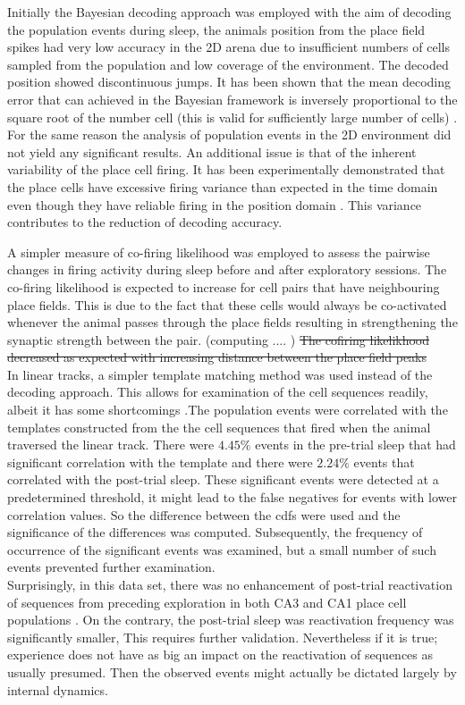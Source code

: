 Initially the Bayesian decoding approach was employed with the aim of decoding the population events during sleep, the animals position from the place field spikes had very low accuracy in the 2D arena due to insufficient numbers of cells sampled from the population and low coverage of the environment. The decoded position showed discontinuous jumps. It has been shown that the mean decoding error that can achieved in the Bayesian framework is inversely proportional to the square root of the number cell (this is valid for sufficiently large number of cells) \cite{Zhang2013}. For the same reason the analysis of population events in the 2D environment did not yield any significant results. An additional issue is that of the inherent variability of the place cell firing. It has been experimentally demonstrated that the place cells have excessive firing variance than expected in the time domain even though they have reliable firing in the position domain \cite{Fenton1998}. This variance contributes to the reduction of decoding accuracy.  

A simpler measure of co-firing likelihood was employed to assess the pairwise changes in firing activity during sleep before and after exploratory sessions. The co-firing likelihood is expected to increase for cell pairs that have neighbouring place fields. This is due to the fact that these cells would always be co-activated whenever the animal passes through the place fields resulting in strengthening the synaptic strength between the pair. (computing .... ) 
\st{The cofiring likelikhood decreased as expected with increasing distance between the place field peaks }\\

In linear tracks, a simpler template matching method was used instead of the decoding approach. This allows for examination of the cell sequences readily, albeit it has some shortcomings \cite{Tatsuno2006}.The population events were correlated with the templates constructed from the the cell sequences that fired when the animal traversed the linear track. There were $4.45 \% $ events in the pre-trial sleep that had significant correlation with the template and there were $ 2.24 \% $  events that correlated with the post-trial sleep. These significant events were detected at a predetermined threshold, it might lead to the false negatives for events with lower correlation values. So the difference between the cdfs were used and the significance of the differences was computed. Subsequently, the frequency of occurrence of the significant events was examined, but a small number of such events prevented further examination.\\ 
Surprisingly, in this data set, there was no enhancement of post-trial reactivation of sequences from preceding exploration in both CA3 and CA1 place cell populations \cite{Lee2002}. On the contrary, the post-trial sleep was reactivation frequency was significantly smaller, This requires further validation. Nevertheless if it is true; experience does not have as big an impact on the reactivation of sequences as usually presumed. Then the observed events might actually be dictated largely by internal dynamics. 

